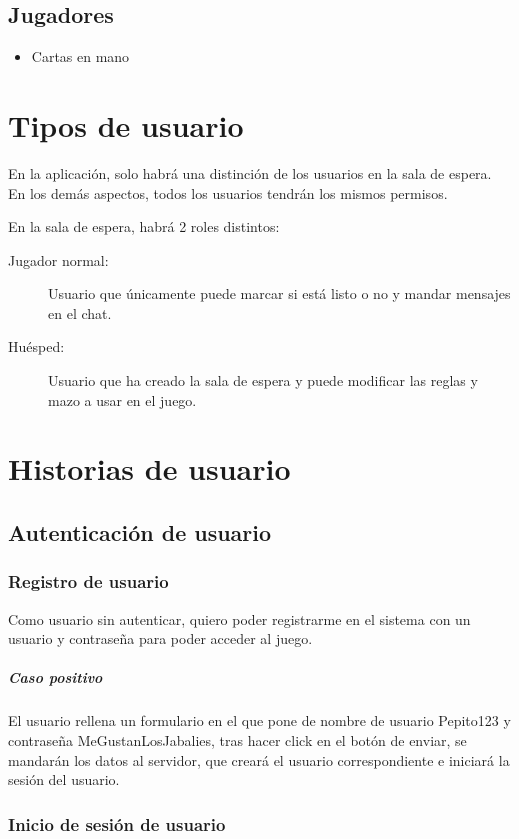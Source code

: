 \subsection{Jugadores}
\begin{itemize}
  \item Cartas en mano
\end{itemize}

\section{Tipos de usuario}
En la aplicación, solo habrá una distinción de los usuarios en la sala de espera.
En los demás aspectos, todos los usuarios tendrán los mismos permisos.

En la sala de espera, habrá 2 roles distintos:
\begin{description}
  \item[Jugador normal:] Usuario que únicamente puede marcar si está listo o no y mandar mensajes 
    en el chat.
  \item[Huésped:] Usuario que ha creado la sala de espera y puede modificar
    las reglas y mazo a usar en el juego.
\end{description}

\section{Historias de usuario}
\subsection{Autenticación de usuario}

\subsubsection{Registro de usuario}

Como usuario sin autenticar, quiero poder registrarme en el sistema con un usuario y contraseña para poder acceder al juego. 

\subparagraph{Caso positivo} %

El usuario rellena un formulario en el que pone de nombre de usuario Pepito123 y contraseña MeGustanLosJabalies, tras hacer click en el botón de enviar, se mandarán los datos al servidor, que creará el usuario correspondiente e iniciará la sesión del usuario. 

\subsubsection{Inicio de sesión de usuario}

